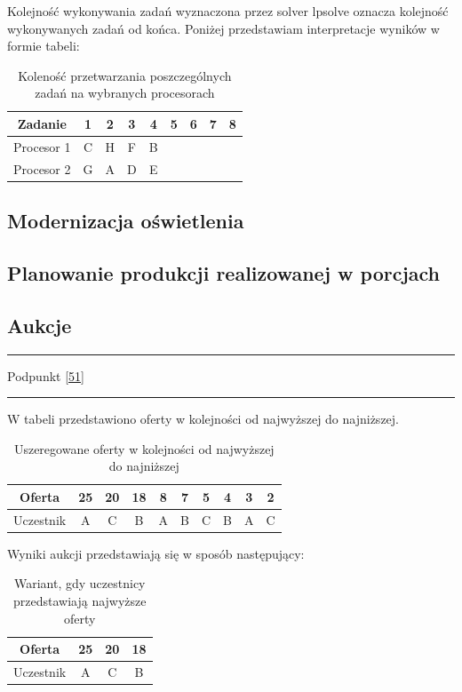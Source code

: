 \documentclass[
    12pt, %
]{../fphw}
\begin{document}
Kolejność wykonywania zadań wyznaczona przez solver lpsolve
oznacza kolejność wykonywanych zadań od końca.
Poniżej przedstawiam interpretacje wyników w formie tabeli:

\begin{table}[H]
    \centering
    \begin{tabular}{| c | c | c | c | c | c | c | c | c |}
        \hline
        Zadanie    & 1 & 2 & 3 & 4 & 5 & 6 & 7 & 8 \\
        \hline
        Procesor 1 & C & H & F & B &   &   &   &   \\
        \hline
        Procesor 2 & G & A & D & E &   &   &   &   \\
        \hline
    \end{tabular}
    \caption{Koleność przetwarzania poszczególnych zadań na wybranych procesorach}
\end{table}

\newpage

\subsection{Modernizacja oświetlenia}
\subsection{Planowanie produkcji realizowanej w porcjach}
\subsection{Aukcje}

\par\noindent\rule{\textwidth}{0.4pt}
Podpunkt \ref{51}
\par\noindent\rule{\textwidth}{0.4pt}

W tabeli przedstawiono oferty w kolejności od najwyższej do najniższej.
\begin{table}[H]
    \centering
    \begin{tabular}{ | c | c | c | c | c | c | c | c | c | c |}
        \hline
        Oferta    & 25 & 20 & 18 & 8 & 7 & 5 & 4 & 3 & 2 \\
        \hline
        Uczestnik & A  & C  & B  & A & B & C & B & A & C \\
        \hline
    \end{tabular}
    \caption{Uszeregowane oferty w kolejności od najwyższej do najniższej}
\end{table}

Wyniki aukcji przedstawiają się w sposób następujący: \\
\begin{table}[H]
    \centering
    \begin{tabular}{ | c | c | c | c |}
        \hline
        Oferta    & 25 & 20 & 18 \\
        \hline
        Uczestnik & A  & C  & B  \\
        \hline
    \end{tabular}
    \caption{Wariant, gdy uczestnicy przedstawiają najwyższe oferty}
\end{table}
\end{document}
